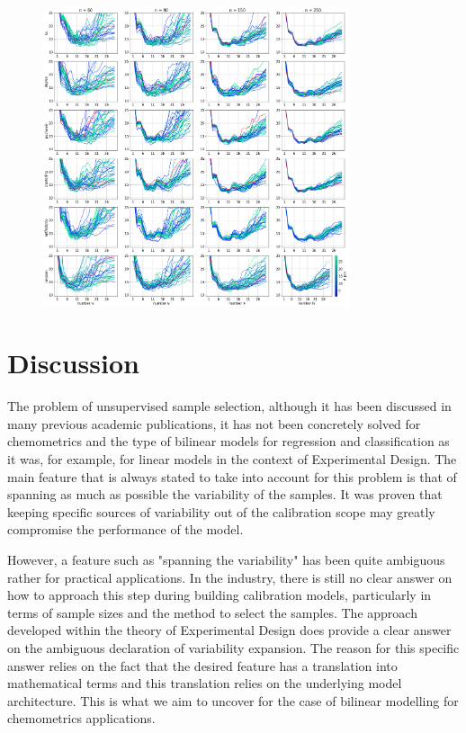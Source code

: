 \documentclass{article}
\begin{document}
\begin{figure}[b]
\includegraphics[width=0.8\textwidth]{manuscript/figures/d02_manure_model_performance.png}
\centering
\caption{}
\label{fig_d02_manure_model_performance}
\end{figure}


\section*{Discussion}\label{discussion}

The problem of unsupervised sample selection, although it has been discussed in many previous academic publications, it has not been concretely solved for chemometrics and the type of bilinear models for regression and classification as it was, for example, for linear models in the context of Experimental Design. The main feature that is always stated to take into account for this problem is that of spanning as much as possible the variability of the samples. It was proven that keeping specific sources of variability out of the calibration scope may greatly compromise the performance of the model. 

However, a feature such as "spanning the variability" has been quite ambiguous rather for practical applications. In the industry, there is still no clear answer on how to approach this step during building calibration models, particularly in terms of sample sizes and the method to select the samples. The approach developed within the theory of Experimental Design does provide a clear answer on the ambiguous declaration of variability expansion. The reason for this specific answer relies on the fact that the desired feature has a translation into mathematical terms and this translation relies on the underlying model architecture. This is what we aim to uncover for the case of bilinear modelling for chemometrics applications. 
\end{document}
